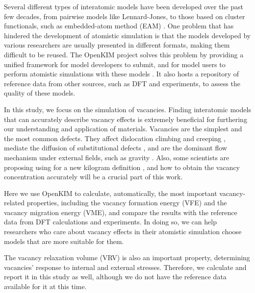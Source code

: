 \documentclass[%
 reprint,
 amsmath,amssymb,
 aps,
]{revtex4-1}
\begin{document}
Several different types of interatomic models have been developed over the past few decades, from pairwise models like Lennard-Jones, to those based on cluster functionals, such as embedded-atom method (EAM) \cite{daw1993embedded, daw1984embedded}.
One problem that has hindered the development of atomistic simulation is that the models developed by various researchers are usually presented in different formats, making them difficult to be reused.
The OpenKIM project \cite{bierbaum2014openkim, openkim2016} solves this problem by providing a unified framework for model developers to submit, and for model users to perform atomistic simulations with these models \cite{tadmor2011potential}.
It also hosts a repository of reference data from other sources, such as DFT and experiments, to assess the quality of these models.

In this study, we focus on the simulation of vacancies.
Finding interatomic models that can accurately describe vacancy effects is extremely beneficial for furthering our understanding and application of materials.
Vacancies are the simplest and the most common defects.
They affect dislocation climbing and creeping \cite{weertman1955theory}, mediate the diffusion of substitutional defects \cite{fahey1989point}, and are the dominant flow mechanism under external fields, such as gravity \cite{sethna2014flow}.
Also, some scientists are proposing using  for a new kilogram definition \cite{andreas2011counting}, and how to obtain the vacancy concentration accurately will be a crucial part of this work.

Here we use OpenKIM to calculate, automatically, the most important vacancy-related properties, including the vacancy formation energy (VFE) and the vacancy migration energy (VME), and compare the results with the reference data from DFT calculations and experiments.
In doing so, we can help researchers who care about vacancy effects in their atomistic simulation choose models that are more suitable for them.

The vacancy relaxation volume (VRV) is also an important property, determining vacancies' response to internal and external stresses.
Therefore, we calculate and report it in this study as well, although we do not have the reference data available for it at this time.
\end{document}
